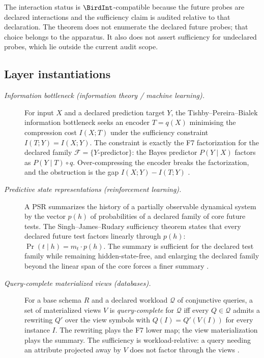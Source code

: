 \documentclass[11pt]{article}
\theoremstyle{definition}
\begin{document}
The interaction status is \(\BirdInt\)-compatible because the future
probes are declared interactions and the sufficiency claim is audited
relative to that declaration.  The theorem does not enumerate the
declared future probes; that choice belongs to the apparatus.  It
also does not assert sufficiency for undeclared probes, which lie
outside the current audit scope.

\subsection*{Layer instantiations}\label{layer-inst:F7}

\begin{description}
\item[\emph{Information bottleneck (information theory / machine
learning).}]
For input \(X\) and a declared prediction target \(Y\), the
Tishby--Pereira--Bialek information bottleneck seeks an encoder
\(T=q(X)\) minimising the compression cost \(I(X;T)\) under the
sufficiency constraint \(I(T;Y)=I(X;Y)\).  The constraint is exactly
the F7 factorization for the declared family
\(\mathcal F=\{Y\text{-predictor}\}\): the Bayes predictor
\(P(Y\mid X)\) factors as \(P(Y\mid T)\circ q\).  Over-compressing the
encoder breaks the factorization, and the obstruction is the gap
\(I(X;Y)-I(T;Y)\)
\citep{TishbyPereiraBialek1999InformationBottleneck}.

\item[\emph{Predictive state representations (reinforcement
learning).}]
A PSR summarizes the history of a partially observable dynamical
system by the vector \(p(h)\) of probabilities of a declared family of
core future tests.  The Singh--James--Rudary sufficiency theorem
states that every declared future test factors linearly through
\(p(h)\): \(\Pr(t\mid h)=m_t\cdot p(h)\).  The summary is sufficient
for the declared test family while remaining hidden-state-free, and
enlarging the declared family beyond the linear span of the core
forces a finer summary
\citep{SinghJamesRudary2004PredictiveStateRepresentations}.

\item[\emph{Query-complete materialized views (databases).}]
For a base schema \(R\) and a declared workload \(\mathcal Q\) of
conjunctive queries, a set of materialized views \(V\) is
\emph{query-complete} for \(\mathcal Q\) iff every \(Q\in\mathcal Q\)
admits a rewriting \(Q'\) over the view symbols with
\(Q(I)=Q'(V(I))\) for every instance \(I\).  The rewriting plays the
F7 lower map; the view materialization plays the summary.  The
sufficiency is workload-relative: a query needing an attribute
projected away by \(V\) does not factor through the views
\citep{Halevy2001AnsweringQueriesUsingViewsSurvey}.


\end{description}
\end{document}
